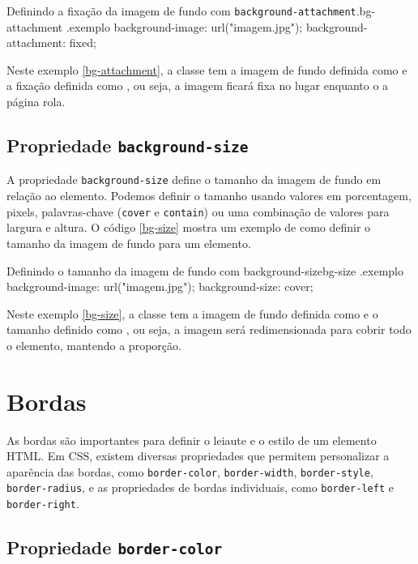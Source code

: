 \begin{csscode}{Definindo a fixação da imagem de fundo com \texttt{background-attachment}.}{bg-attachment}
.exemplo {
    background-image: url("imagem.jpg");
    background-attachment: fixed;
}
\end{csscode}

Neste exemplo \ref{bg-attachment}, a classe  tem a imagem de fundo definida como  e a fixação definida como , ou seja, a imagem ficará fixa no lugar enquanto o a página rola.

\subsection{Propriedade \texttt{background-size}}

A propriedade \texttt{background-size} define o tamanho da imagem de fundo em relação ao elemento. Podemos definir o tamanho usando valores em porcentagem, pixels, palavras-chave (\texttt{cover} e \texttt{contain}) ou uma combinação de valores para largura e altura. O código \ref{bg-size} mostra um exemplo de como definir o tamanho da imagem de fundo para um elemento.

\begin{csscode}{Definindo o tamanho da imagem de fundo com background-size}{bg-size}
.exemplo {
    background-image: url("imagem.jpg");
    background-size: cover;
}
\end{csscode}

Neste exemplo \ref{bg-size}, a classe  tem a imagem de fundo definida como  e o tamanho definido como , ou seja, a imagem será redimensionada para cobrir todo o elemento, mantendo a proporção.

\section{Bordas}

As bordas são importantes para definir o leiaute e o estilo de um elemento HTML. Em CSS, existem diversas propriedades que permitem personalizar a aparência das bordas, como \texttt{border-color}, \texttt{border-width}, \texttt{border-style}, \texttt{border-radius}, e as propriedades de bordas individuais, como \texttt{border-left} e \texttt{border-right}.

\subsection{Propriedade \texttt{border-color}}

